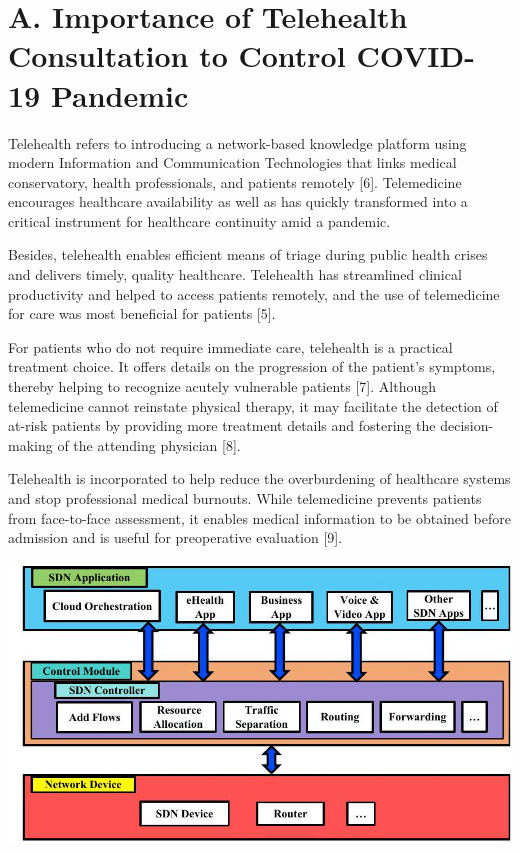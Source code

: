 \documentclass[10pt]{article}
\begin{document}
\section{A. Importance of Telehealth Consultation to Control COVID- 19 Pandemic}
Telehealth refers to introducing a network-based knowledge platform using modern Information and Communication Technologies that links medical conservatory, health professionals, and patients remotely [6]. Telemedicine encourages healthcare availability as well as has quickly transformed into a critical instrument for healthcare continuity amid a pandemic.

Besides, telehealth enables efficient means of triage during public health crises and delivers timely, quality healthcare. Telehealth has streamlined clinical productivity and helped to access patients remotely, and the use of telemedicine for care was most beneficial for patients [5].

For patients who do not require immediate care, telehealth is a practical treatment choice. It offers details on the progression of the patient's symptoms, thereby helping to recognize acutely vulnerable patients [7]. Although telemedicine cannot reinstate physical therapy, it may facilitate the detection of at-risk patients by providing more treatment details and fostering the decision-making of the attending physician [8].

Telehealth is incorporated to help reduce the overburdening of healthcare systems and stop professional medical burnouts. While telemedicine prevents patients from face-to-face assessment, it enables medical information to be obtained before admission and is useful for preoperative evaluation [9].

\begin{center}
\includegraphics[max width=\textwidth]{2023_10_07_f971bc9d1cbbc236be07g-2}
\end{center}
\end{document}
